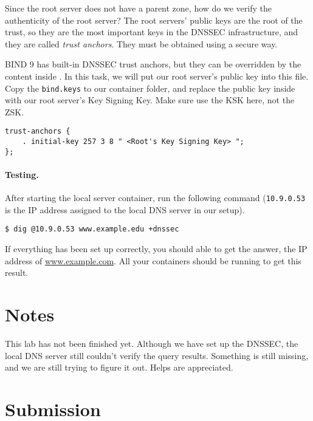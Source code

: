 Since the root server does not have a parent zone, how do we verify the authenticity 
of the root server?  The root servers' public keys are the root of the trust, so they are 
the most important keys in the DNSSEC infrastructure, and they are called \textit{trust
anchors}. They must be obtained using a secure way. 

BIND 9 has built-in DNSSEC trust anchors, but they can be 
overridden by the content inside .  
In this task, we will put our root server's public key 
into this file. Copy the \texttt{bind.keys} to our container folder,
and replace the public key inside with our root server's 
Key Signing Key. Make sure use the KSK here, not the ZSK. 


\begin{lstlisting}
trust-anchors {
    . initial-key 257 3 8 " <Root's Key Signing Key> ";
};
\end{lstlisting}


\paragraph{Testing.} After starting the local server container, run the 
following command (\texttt{10.9.0.53} is the IP address 
assigned to the local DNS server in our setup).

\begin{lstlisting}
$ dig @10.9.0.53 www.example.edu +dnssec
\end{lstlisting}

If everything has been set up correctly, you should able to get the 
answer, the IP address of \url{www.example.com}. All your containers
should be running to get this result. 




\section{Notes} 

This lab has not been finished yet. Although we have set up the DNSSEC, the local
DNS server still couldn't verify the query results. Something is still missing, and
we are still trying to figure it out. Helps are appreciated. 




\section{Submission}





